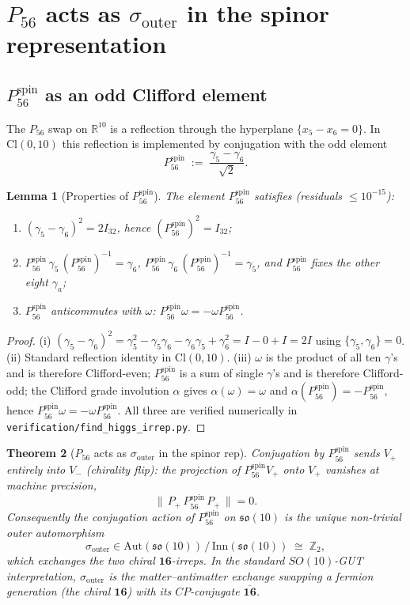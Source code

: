 \documentclass[11pt,reqno]{amsart}
\newtheorem{theorem}{Theorem}[section]
\newtheorem{lemma}[theorem]{Lemma}
\theoremstyle{definition}
\newcommand{\Z}{\mathbb{Z}}
\newcommand{\R}{\mathbb{R}}
\newcommand{\so}{\mathfrak{so}}
\newcommand{\Cl}{\mathrm{Cl}}
\newcommand{\Psix}{P_{56}}
\newcommand{\Psixspin}{P_{56}^{\mathrm{spin}}}
\newcommand{\sout}{\sigma_{\mathrm{outer}}}
\begin{document}
\section{$\Psix$ acts as $\sout$ in the spinor representation}
\label{sec:p56-outer}

\subsection{$\Psixspin$ as an odd Clifford element}

The $\Psix$ swap on $\R^{10}$ is a reflection through the hyperplane
$\{x_5 - x_6 = 0\}$. In $\Cl(0, 10)$ this reflection is implemented
by conjugation with the odd element
\[
  \Psixspin \;:=\; \frac{\gamma_5 - \gamma_6}{\sqrt{2}}.
\]

\begin{lemma}[Properties of $\Psixspin$]
\label{lem:p56-properties}
The element $\Psixspin$ satisfies (residuals $\le 10^{-15}$):
\begin{enumerate}[label=\textup{(\roman*)}, leftmargin=*]
\item $(\gamma_5 - \gamma_6)^2 = 2 I_{32}$, hence
  $(\Psixspin)^2 = I_{32}$;
\item $\Psixspin\, \gamma_5\, (\Psixspin)^{-1} = \gamma_6$,
  $\Psixspin\, \gamma_6\, (\Psixspin)^{-1} = \gamma_5$, and
  $\Psixspin$ fixes the other eight $\gamma_a$;
\item $\Psixspin$ anticommutes with $\omega$: $\Psixspin \omega
  = -\omega \Psixspin$.
\end{enumerate}
\end{lemma}

\begin{proof}
(i) $(\gamma_5 - \gamma_6)^2 = \gamma_5^2 - \gamma_5 \gamma_6 -
\gamma_6 \gamma_5 + \gamma_6^2 = I - 0 + I = 2I$ using
$\{\gamma_5, \gamma_6\} = 0$. (ii) Standard reflection identity in
$\Cl(0, 10)$. (iii) $\omega$ is the product of all ten $\gamma$'s
and is therefore Clifford-even; $\Psixspin$ is a sum of single
$\gamma$'s and is therefore Clifford-odd; the Clifford grade
involution $\alpha$ gives $\alpha(\omega) = \omega$ and
$\alpha(\Psixspin) = -\Psixspin$, hence $\Psixspin \omega =
-\omega \Psixspin$. All three are verified numerically in
\texttt{verification/find\_higgs\_irrep.py}.
\end{proof}

\begin{theorem}[$\Psix$ acts as $\sout$ in the spinor rep]
\label{thm:p56-outer}
Conjugation by $\Psixspin$ sends $V_+$ entirely into $V_-$
(chirality flip): the projection of $\Psixspin V_+$ onto $V_+$
vanishes at machine precision,
\[
  \|\,P_+\, \Psixspin\, P_+\,\| = 0.
\]
Consequently the conjugation action of $\Psixspin$ on $\so(10)$ is
the unique non-trivial outer automorphism
\[
  \sout \in \mathrm{Aut}(\so(10))\,/\,\mathrm{Inn}(\so(10))
        \;\cong\; \Z_2,
\]
which exchanges the two chiral $\mathbf{16}$-irreps. In the
standard $SO(10)$-GUT interpretation, $\sout$ is the
\emph{matter--antimatter exchange} swapping a fermion generation
(the chiral $\mathbf{16}$) with its $CP$-conjugate
$\overline{\mathbf{16}}$.
\end{theorem}
\end{document}
